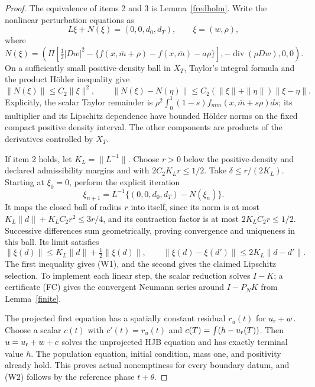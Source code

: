 \documentclass[11pt,a4paper]{article}
\begin{document}
\begin{proof}
The equivalence of items 2 and 3 is Lemma~\ref{fredholm}. Write the
nonlinear perturbation equations as
\[
 L\xi+N(\xi)=(0,0,d_0,d_T),\qquad \xi=(w,\rho),
\]
where
\begin{equation}\tag{N1}\label{N1}
 N(\xi)=\left(\Pi\left[\tfrac12|Dw|^2-
 \{f(x,\bar m+\rho)-f(x,\bar m)-a\rho\}\right],
 -\operatorname{div}(\rho Dw),0,0\right).
\end{equation}
On a sufficiently small positive-density ball in $X_T$, Taylor's
integral formula and the product H\"older inequality give
\begin{equation}\tag{N2}\label{N2}
 \|N(\xi)\|\leq C_2\|\xi\|^2,\qquad
 \|N(\xi)-N(\eta)\|\leq C_2(\|\xi\|+\|\eta\|)\|\xi-\eta\|.
\end{equation}
Explicitly, the scalar Taylor remainder is
$\rho^2\int_0^1(1-s)f_{mm}(x,\bar m+s\rho)ds$; its multiplier
and its Lipschitz dependence have bounded H\"older norms on the fixed
compact positive density interval. The other components are products
of the derivatives controlled by $X_T$.

If item 2 holds, let $K_L=\|L^{-1}\|$. Choose $r>0$ below the
positive-density and declared admissibility margins and with
$2C_2K_Lr\leq1/2$. Take $\delta\leq r/(2K_L)$. Starting at $\xi_0=0$,
perform the explicit iteration
\begin{equation}\tag{SEL}\label{SEL}
 \xi_{n+1}=L^{-1}\{(0,0,d_0,d_T)-N(\xi_n)\}.
\end{equation}
It maps the closed ball of radius $r$ into itself, since its norm
is at most $K_L\|d\|+K_LC_2r^2\leq3r/4$, and its contraction
factor is at most $2K_LC_2r\leq1/2$. Successive differences sum
geometrically, proving convergence and uniqueness in this ball.
Its limit satisfies
\[
 \|\xi(d)\|\leq K_L\|d\|+\tfrac12\|\xi(d)\|,
 \qquad \|\xi(d)-\xi(d')\|\leq2K_L\|d-d'\|.
\]
The first inequality gives (W1), and the second gives the claimed
Lipschitz selection. To implement each linear step, the scalar
reduction solves $I-K$; a certificate (FC) gives the convergent
Neumann series around $I-P_NK$ from Lemma~\ref{finite}.

The projected first equation has a spatially constant residual
$r_u(t)$ for $u_{\rm r}+w$. Choose a scalar $c(t)$ with
$c'(t)=r_u(t)$ and
$c(T)=\int(h-u_{\rm r}(T))$. Then
$u=u_{\rm r}+w+c$ solves the unprojected HJB equation and has exactly
terminal value $h$. The population equation, initial condition, mass
one, and positivity already hold. This proves actual nonemptiness
for every boundary datum, and (W2) follows by the reference phase
$t+\theta$.


\end{proof}
\end{document}
